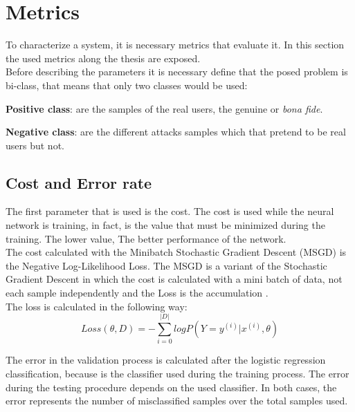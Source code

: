 \section{Metrics}
To characterize a system, it is necessary metrics that evaluate it. In this section the used metrics along the thesis are exposed.\\

Before describing the parameters it is necessary define that the posed problem is bi-class, that means that only two classes would be used:

\begin{description}
\item \textbf{Positive class}: are the samples of the real users, the genuine or \textit{bona fide}.
\item \textbf{Negative class}: are the different attacks samples which that pretend to be real users but not.
\end{description}

\subsection{Cost and Error rate}
The first parameter that is used is the cost. The cost is used while the neural network is training, in fact, is the value that must be minimized during the training. The lower value, The better performance of the network.\\

The cost calculated with the Minibatch Stochastic Gradient Descent (MSGD) is the Negative Log-Likelihood Loss. The MSGD is a variant of the Stochastic Gradient Descent in which the cost is calculated with a mini batch of data, not each sample independently and the Loss is the accumulation \cite{Stutz}.\\

The loss is calculated in the following way:\\

\begin{equation}
  Loss(\theta, D) = - \sum_{i=0}^{|D|}log P(Y = y^{(i)}|x^{(i)}, \theta)
\end{equation}

The error in the validation process is calculated after the logistic regression classification, because is the classifier used during the training process. The error during the testing procedure depends on the used classifier. In both cases, the error represents the number of misclassified samples over the total samples used.\\


